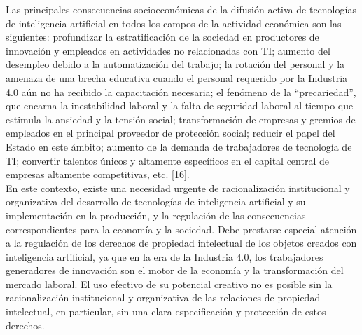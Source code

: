 Las principales consecuencias socioeconómicas de la difusión activa de tecnologías de inteligencia artificial en todos los campos de la actividad económica son las siguientes: profundizar la estratificación de la sociedad en productores de innovación y empleados en actividades no relacionadas con TI; aumento del desempleo debido a la automatización del trabajo; la rotación del personal y la amenaza de una brecha educativa cuando el personal requerido por la Industria 4.0 aún no ha recibido la capacitación necesaria; el fenómeno de la “precariedad”, que encarna la inestabilidad laboral y la falta de seguridad laboral al tiempo que estimula la ansiedad y la tensión social; transformación de empresas y gremios de empleados en el principal proveedor de protección social; reducir el papel del Estado en este ámbito; aumento de la demanda de trabajadores de tecnología de TI; convertir talentos únicos y altamente específicos en el capital central de empresas altamente competitivas, etc. [16].\\

En este contexto, existe una necesidad urgente de racionalización institucional y organizativa del desarrollo de tecnologías de inteligencia artificial y su implementación en la producción, y la regulación de las consecuencias correspondientes para la economía y la sociedad. Debe prestarse especial atención a la regulación de los derechos de propiedad intelectual de los objetos creados con inteligencia artificial, ya que en la era de la Industria 4.0, los trabajadores generadores de innovación son el motor de la economía y la transformación del mercado laboral. El uso efectivo de su potencial creativo no es posible sin la racionalización institucional y organizativa de las relaciones de propiedad intelectual, en particular, sin una clara especificación y protección de estos derechos.
